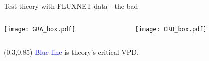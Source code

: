 \documentclass[aspectratio=169]{beamer}
\begin{document}
\begin{frame}{Test theory with FLUXNET data - the bad}
  \begin{columns}
    \begin{column}{0.5\textwidth}
      \texttt{[image: GRA\_box.pdf]}
    \end{column}
    \begin{column}{0.5\textwidth}
      \texttt{[image: CRO\_box.pdf]}
    \end{column}
  \end{columns}
  \begin{textblock*}{1.0\textwidth}(0.3\textwidth,0.85\textheight)
    \textcolor{blue}{Blue line} is theory's critical VPD.\\
  \end{textblock*}

\end{frame}



\end{document}
